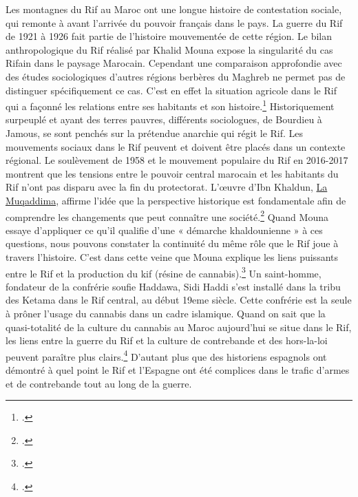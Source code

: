 Les montagnes du Rif au Maroc ont une longue histoire de contestation sociale, qui remonte à avant l'arrivée du pouvoir français dans le pays. La guerre du Rif de 1921 à 1926 fait partie de l’histoire mouvementée de cette région. Le bilan anthropologique du Rif réalisé par Khalid Mouna expose la singularité du cas Rifain dans le paysage Marocain. Cependant une comparaison approfondie avec des études sociologiques d’autres régions berbères du Maghreb ne permet pas de distinguer spécifiquement ce cas. C’est en effet la situation agricole dans le Rif qui a façonné les relations entre ses habitants et son histoire.\footcites[101]{mouna2008} Historiquement surpeuplé et ayant des terres pauvres, différents sociologues, de Bourdieu à Jamous, se sont penchés sur la prétendue anarchie qui régit le Rif. Les mouvements sociaux  dans le Rif peuvent et doivent être placés dans un contexte régional. Le soulèvement de 1958 et le mouvement populaire du Rif en 2016-2017 montrent que les tensions entre le pouvoir central marocain et les habitants du Rif n’ont pas disparu avec la fin du protectorat. L'œuvre d’Ibn Khaldun, \underline{La Muqaddima}, affirme l’idée que la perspective historique est fondamentale afin de comprendre les changements que peut connaître une société.\footcites[103]{mouna2008}  Quand Mouna essaye d’appliquer ce qu’il qualifie d’une « démarche khaldounienne » à ces questions, nous pouvons constater la continuité du même rôle que le Rif joue à travers l’histoire. C’est dans cette veine  que Mouna explique les liens puissants entre le Rif et la production du kif (résine de cannabis).\footcites[105]{mouna2008} Un saint-homme, fondateur de la confrérie soufie Haddawa, Sidi Haddi s’est installé dans la tribu des Ketama dans le Rif central, au début 19eme siècle. Cette confrérie est la seule à prôner l'usage du cannabis dans un cadre islamique. Quand on sait que la quasi-totalité de la culture du cannabis au Maroc aujourd’hui se situe dans le Rif, les liens entre la guerre du Rif et la culture de contrebande et des hors-la-loi peuvent paraître plus clairs.\footcites{chouvy2007} D’autant plus que des historiens espagnols ont démontré à quel point le Rif et l'Espagne ont été complices dans le trafic d'armes et de contrebande tout au long de la guerre.\\


